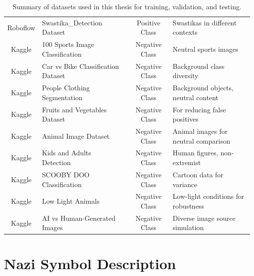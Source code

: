 \begin{table}[htbp]
{\begin{tabular}{clcl}
Roboflow & Swastika\_Detection Dataset~\parencite{swastika_detection_dataset} & Positive Class & Swastikas in different contexts \\

Kaggle & 100 Sports Image Classification~\parencite{100_sport_image_classification_dataset} & Negative Class & Neutral sports images \\

Kaggle & Car vs Bike Classification Dataset~\parencite{car_bike_classification_dataset} & Negative Class & Background class diversity \\

Kaggle & People Clothing Segmentation~\parencite{people_clothing_segmentation_dataset} & Negative Class & Background objects, neutral content \\

Kaggle & Fruits and Vegetables Dataset~\parencite{fruit_and_vegetable_image_recognition_dataset} & Negative Class & For reducing false positives \\

Kaggle & Animal Image Dataset~\parencite{animal_image_dataset} & Negative Class & Animal images for neutral comparison \\

Kaggle & Kids and Adults Detection~\parencite{kids_and_adults_detection_dataset} & Negative Class & Human figures, non-extremist \\

Kaggle & SCOOBY DOO Classification~\parencite{scooby_doo_classification_dataset} & Negative Class & Cartoon data for variance \\

Kaggle & Low Light Animals~\parencite{subrata_sarkar_2025} & Negative Class & Low-light conditions for robustness \\

Kaggle & AI vs Human-Generated Images~\parencite{ai_vs_human_generated_images_dataset} & Negative Class & Diverse image source simulation \\
\bottomrule
\end{tabular}
}
\caption{Summary of datasets used in this thesis for training, validation, and testing.}
\label{tab:dataset_summary}
\end{table}

\section{Nazi Symbol Description}
  \label{appendix:symbol-description}

